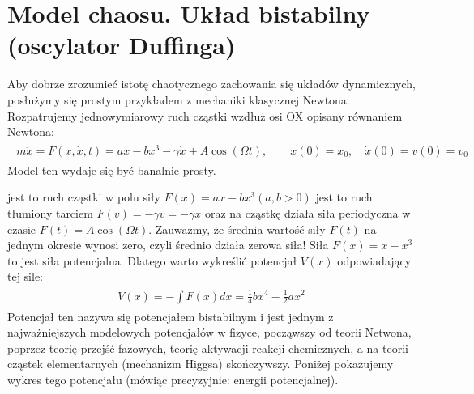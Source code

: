 \documentclass[a4paper,12pt,polish]{sphinxmanual}
\begin{document}
\section{Model chaosu. Układ bistabilny (oscylator Duffinga)}
\label{ch2/chII011:model-chaosu-uklad-bistabilny-oscylator-duffinga}
Aby dobrze zrozumieć istotę chaotycznego zachowania się układów dynamicznych, posłużymy się prostym przykładem z mechaniki klasycznej Newtona. Rozpatrujemy jednowymiarowy ruch cząstki wzdłuż osi OX opisany równaniem Newtona:
\label{ch2/chII011:equation-eqn1}\begin{gather}
\begin{split}m \ddot x = F(x, \dot x, t) =ax - bx^3 - \gamma \dot x + A \cos(\Omega t), \qquad x(0) = x_0, \quad  \dot x(0) = v(0) = v_0\end{split}\label{ch2/chII011-eqn1}
\end{gather}
Model ten wydaje się być banalnie prosty.

jest to ruch cząstki w polu siły $F(x) = ax-bx^3  (a, b > 0)$
jest to ruch tłumiony tarciem $F(v) = - \gamma v = -\gamma \dot x$ oraz
na cząstkę działa siła periodyczna w czasie $F(t) = A\cos(\Omega t)$.
Zauważmy, że średnia wartość siły $F(t)$ na jednym okresie wynosi  zero, czyli średnio działa zerowa siła! Siła $F(x) = x-x^3$ to jest siła potencjalna. Dlatego warto wykreślić potencjał $V(x)$  odpowiadający tej sile:
\label{ch2/chII011:equation-eqn2}\begin{gather}
\begin{split}V(x) = - \int F(x) dx = \frac{1}{4}  b x^4 - \frac{1}{2}  a x^2\end{split}\label{ch2/chII011-eqn2}
\end{gather}
Potencjał  ten nazywa się potencjałem bistabilnym i jest jednym z najważniejszych modelowych potencjałów w fizyce, począwszy od teorii Netwona, poprzez teorię przejść fazowych, teorię aktywacji  reakcji chemicznych, a na teorii cząstek elementarnych (mechanizm Higgsa) skończywszy. Poniżej pokazujemy wykres tego potencjału (mówiąc precyzyjnie: energii potencjalnej).
\end{document}
